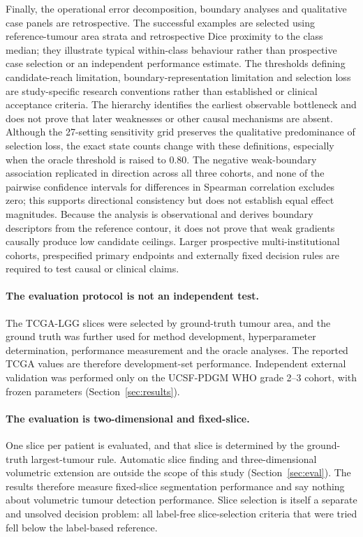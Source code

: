 \documentclass[11pt,a4paper]{article}
\begin{document}
Finally, the operational error decomposition, boundary analyses and qualitative case panels
are retrospective. The successful examples are selected using reference-tumour
area strata and retrospective Dice proximity to the class median; they illustrate
typical within-class behaviour rather than prospective case selection or an
independent performance estimate. The
thresholds defining candidate-reach limitation, boundary-representation
limitation and selection loss are study-specific research conventions rather
than established or clinical acceptance criteria. The hierarchy identifies the
earliest observable bottleneck and does not prove that later weaknesses or other
causal mechanisms are absent. Although the 27-setting sensitivity grid preserves
the qualitative predominance of selection loss, the exact state counts change with these definitions,
especially when the oracle threshold is raised to $0.80$.
The negative weak-boundary association replicated in direction across all three
cohorts, and none of the pairwise confidence intervals for differences in
Spearman correlation excludes zero; this supports directional consistency but
does not establish equal effect magnitudes. Because the analysis is observational
and derives boundary descriptors from the reference contour, it does not prove
that weak gradients causally produce low candidate ceilings. Larger prospective
multi-institutional cohorts, prespecified primary endpoints and externally fixed
decision rules are required to test causal or clinical claims.

\iffalse %

\paragraph{The evaluation protocol is not an independent test.} The TCGA-LGG
slices were selected by ground-truth tumour area, and the ground truth was further
used for method development, hyperparameter determination, performance measurement
and the oracle analyses. The reported TCGA values are therefore development-set
performance. Independent external validation was performed only on the UCSF-PDGM
WHO grade 2--3 cohort, with frozen parameters (Section~\ref{sec:results}).

\paragraph{The evaluation is two-dimensional and fixed-slice.} One slice per
patient is evaluated, and that slice is determined by the ground-truth
largest-tumour rule. Automatic slice finding and three-dimensional volumetric
extension are outside the scope of this study (Section~\ref{sec:eval}). The results
therefore measure fixed-slice segmentation performance and say nothing about
volumetric tumour detection performance. Slice selection is itself a separate and
unsolved decision problem: all label-free slice-selection criteria that were tried
fell below the label-based reference.
\end{document}
